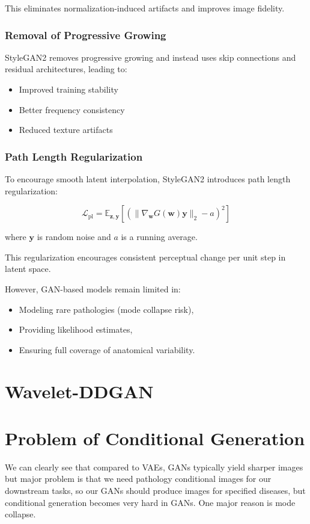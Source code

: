 This eliminates normalization-induced artifacts and improves image fidelity.

\subsubsection{Removal of Progressive Growing}

StyleGAN2 removes progressive growing and instead uses skip connections and residual architectures, leading to:

\begin{itemize}
    \item Improved training stability
    \item Better frequency consistency
    \item Reduced texture artifacts
\end{itemize}

\subsubsection{Path Length Regularization}

To encourage smooth latent interpolation, StyleGAN2 introduces path length regularization:

\begin{equation}
\mathcal{L}_{\text{pl}} =
\mathbb{E}_{\mathbf{z}, \mathbf{y}}
\left[
\left(
\|\nabla_{\mathbf{w}} G(\mathbf{w}) \mathbf{y}\|_2 - a
\right)^2
\right]
\end{equation}

where $\mathbf{y}$ is random noise and $a$ is a running average.

This regularization encourages consistent perceptual change per unit step in latent space.

\bigskip



However, GAN-based models remain limited in:

\begin{itemize}
    \item Modeling rare pathologies (mode collapse risk),
    \item Providing likelihood estimates,
    \item Ensuring full coverage of anatomical variability.
\end{itemize}





\section{Wavelet-DDGAN}

\section{Problem of Conditional Generation}

We can clearly see that compared to VAEs, GANs typically yield sharper images but major problem is that we need pathology conditional images for our downstream tasks, so our GANs should produce images for specified diseases, but conditional generation becomes very hard in GANs. One major reason is mode collapse. 